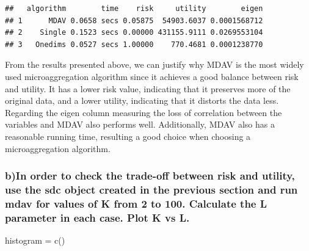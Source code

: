 \documentclass[
]{article}
\newenvironment{Shaded}{\begin{snugshade}}{\end{snugshade}}
\newcommand{\FunctionTok}[1]{\textcolor[rgb]{0.00,0.00,0.00}{#1}}
\newcommand{\NormalTok}[1]{#1}
\newcommand{\OtherTok}[1]{\textcolor[rgb]{0.56,0.35,0.01}{#1}}
\begin{document}
\begin{verbatim}
##   algorithm        time    risk     utility        eigen
## 1      MDAV 0.0658 secs 0.05875  54903.6037 0.0001568712
## 2    Single 0.1523 secs 0.00000 431155.9111 0.0269553104
## 3   Onedims 0.0527 secs 1.00000    770.4681 0.0001238770
\end{verbatim}

From the results presented above, we can justify why MDAV is the most
widely used microaggregation algorithm since it achieves a good balance
between risk and utility. It has a lower risk value, indicating that it
preserves more of the original data, and a lower utility, indicating
that it distorts the data less. Regarding the eigen column measuring the
loss of correlation between the variables and MDAV also performs well.
Additionally, MDAV also has a reasonable running time, resulting a good
choice when choosing a microaggregation algorithm.

\hypertarget{bin-order-to-check-the-trade-off-between-risk-and-utility-use-the-sdc-object-created-in-the-previous-section-and-run-mdav-for-values-of-k-from-2-to-100.-calculate-the-l-parameter-in-each-case.-plot-k-vs-l.}{%
\subsubsection{b)In order to check the trade-off between risk and
utility, use the sdc object created in the previous section and run mdav
for values of K from 2 to 100. Calculate the L parameter in each case.
Plot K vs
L.}\label{bin-order-to-check-the-trade-off-between-risk-and-utility-use-the-sdc-object-created-in-the-previous-section-and-run-mdav-for-values-of-k-from-2-to-100.-calculate-the-l-parameter-in-each-case.-plot-k-vs-l.}}

\begin{Shaded}
\begin{Highlighting}[]
\NormalTok{histogram }\OtherTok{=} \FunctionTok{c}\NormalTok{()}
\end{Highlighting}
\end{Shaded}
\end{document}
